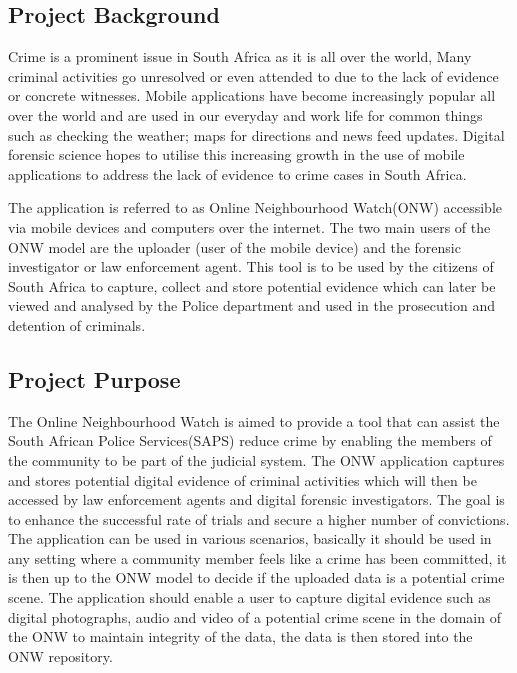 \documentclass[a4paper,12pt]{article}
\begin{document}
\subsection{Project Background}
Crime is a prominent issue in South Africa as it is all over the world, Many criminal activities go unresolved or even attended to due to the lack of evidence or concrete witnesses.  Mobile applications have become increasingly popular all over the world and are used in our everyday and work life for common things such as checking the weather; maps for directions and news feed updates.  Digital forensic science hopes to utilise this increasing growth in the use of mobile applications to address the lack of evidence to crime cases in South Africa.

The application is referred to as Online Neighbourhood Watch(ONW) accessible via mobile devices and computers over the internet.  The two main users of the ONW model are the uploader (user of the mobile device) and the forensic investigator or law enforcement agent. 
This tool is to be used by the citizens of South Africa to capture, collect and store potential evidence which can later be viewed and analysed by the Police department and used in the prosecution and detention of criminals.
\subsection{Project Purpose}
The Online Neighbourhood Watch is aimed to provide a tool that can assist the South African Police Services(SAPS) reduce crime by enabling the members of the community to be part of the judicial system.  The ONW application captures and stores potential digital evidence of criminal activities which will then be accessed by law enforcement agents and digital forensic investigators.  The goal is to enhance the successful rate of trials and secure a higher number of convictions.\newline
The application can be used in various scenarios, basically it should be used in any setting where a community member feels like a crime has been committed, it is then up to the ONW model to decide if the uploaded data is a potential crime scene. The application should enable a user to capture digital evidence such as digital photographs, audio and video of a potential crime scene in the domain of the ONW to maintain integrity of the data, the data is then stored into the ONW repository.
\end{document}
